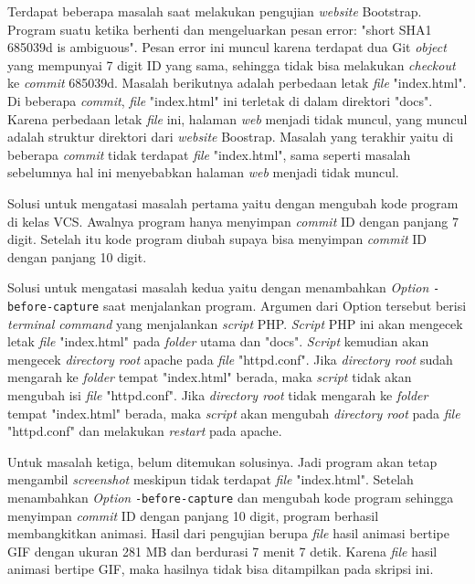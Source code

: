 \begin{enumerate}
Terdapat beberapa masalah saat melakukan pengujian \textit{website} Bootstrap. Program suatu ketika berhenti dan mengeluarkan pesan error: "short SHA1 685039d is ambiguous". Pesan error ini muncul karena terdapat dua Git \textit{object} yang mempunyai 7 digit ID yang sama, sehingga tidak bisa melakukan \textit{checkout} ke \textit{commit} 685039d. Masalah berikutnya adalah perbedaan letak \textit{file} "index.html". Di beberapa \textit{commit}, \textit{file} "index.html" ini terletak di dalam direktori "docs". Karena perbedaan letak \textit{file} ini, halaman \textit{web} menjadi tidak muncul, yang muncul adalah struktur direktori dari \textit{website} Boostrap. Masalah yang terakhir yaitu di beberapa \textit{commit} tidak terdapat \textit{file} "index.html", sama seperti masalah sebelumnya hal ini menyebabkan halaman \textit{web} menjadi tidak muncul.

Solusi untuk mengatasi masalah pertama yaitu dengan mengubah kode program di kelas VCS. Awalnya program hanya menyimpan \textit{commit} ID dengan panjang 7 digit. Setelah itu kode program diubah supaya bisa menyimpan \textit{commit} ID dengan panjang 10 digit. 

Solusi untuk mengatasi masalah kedua yaitu dengan menambahkan \textit{Option} \texttt{-before-capture} saat menjalankan program. Argumen dari Option tersebut berisi \textit{terminal command} yang menjalankan \textit{script} PHP. \textit{Script} PHP ini akan mengecek letak \textit{file} "index.html" pada \textit{folder} utama dan "docs". \textit{Script} kemudian akan mengecek \textit{directory root} apache pada \textit{file} "httpd.conf". Jika \textit{directory root} sudah mengarah ke \textit{folder} tempat "index.html" berada, maka \textit{script} tidak akan mengubah isi \textit{file} "httpd.conf". Jika \textit{directory root} tidak mengarah ke \textit{folder} tempat "index.html" berada, maka \textit{script} akan mengubah \textit{directory root} pada \textit{file} "httpd.conf" dan melakukan \textit{restart} pada apache.

Untuk masalah ketiga, belum ditemukan solusinya. Jadi program akan tetap mengambil \textit{screenshot} meskipun tidak terdapat \textit{file} "index.html". Setelah menambahkan \textit{Option} \texttt{-before-capture} dan mengubah kode program sehingga menyimpan \textit{commit} ID dengan panjang 10 digit, program berhasil membangkitkan animasi. Hasil dari pengujian berupa \textit{file} hasil animasi bertipe GIF dengan ukuran 281 MB dan berdurasi 7 menit 7 detik. Karena \textit{file} hasil animasi bertipe GIF, maka hasilnya tidak bisa ditampilkan pada skripsi ini.



\end{enumerate}